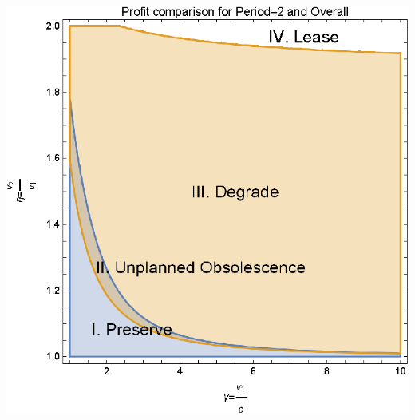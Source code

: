 \documentclass{article}
\begin{document}
\includegraphics{2020_05_19-overleaf-mirror_gr6.eps}
\end{document}
